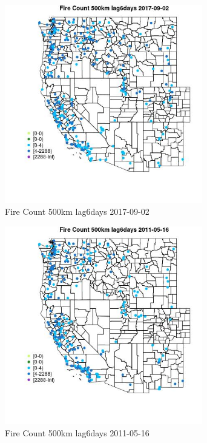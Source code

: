\begin{figure} 
\centering  
\includegraphics[width=0.77\textwidth]{Code_Outputs/Report_ML_input_PM25_Step4_part_e_de_duplicated_aves_compiled_2019-05-21wNAs_MapObsFire_Count_500km_lag6days2017-09-02.jpg} 
\caption{\label{fig:Report_ML_input_PM25_Step4_part_e_de_duplicated_aves_compiled_2019-05-21wNAsMapObsFire_Count_500km_lag6days2017-09-02}Fire Count 500km lag6days 2017-09-02} 
\end{figure} 
 

\begin{figure} 
\centering  
\includegraphics[width=0.77\textwidth]{Code_Outputs/Report_ML_input_PM25_Step4_part_e_de_duplicated_aves_compiled_2019-05-21wNAs_MapObsFire_Count_500km_lag6days2011-05-16.jpg} 
\caption{\label{fig:Report_ML_input_PM25_Step4_part_e_de_duplicated_aves_compiled_2019-05-21wNAsMapObsFire_Count_500km_lag6days2011-05-16}Fire Count 500km lag6days 2011-05-16} 
\end{figure} 
 

